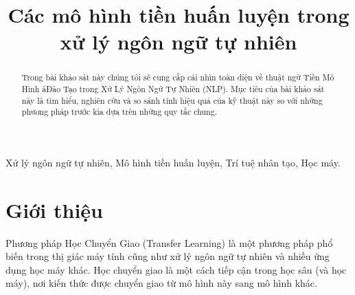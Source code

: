 \documentclass[conference]{IEEEtran}
\begin{document}
\title{Các mô hình tiền huấn luyện trong xử lý ngôn ngữ tự nhiên}

\author{
\and

\and

\and

}

\maketitle

\begin{abstract}
Trong bài khảo sát này chúng tôi sẽ cung cấp cái nhìn toàn diện về thuật ngữ Tiền Mô Hình âĐào Tạo trong Xử Lý Ngôn Ngữ Tự Nhiên (NLP). Mục tiêu của bài khảo sát này là tìm hiểu, nghiên cứu và so sánh tính hiệu quả của kỹ thuật này so với những phương pháp trước kia dựa trên những quy tắc chung.     
\end{abstract}

\begin{IEEEkeywords}
Xử lý ngôn ngữ tự nhiên, Mô hình tiền huấn luyện, Trí tuệ nhân tạo, Học máy.
\end{IEEEkeywords}

\section{Giới thiệu}
Phương pháp Học Chuyển Giao (Transfer Learning) là một phương pháp phổ biến trong thị giác máy tính cũng như xử lý ngôn ngữ tự nhiên và nhiều ứng dụng học máy khác. Học chuyển giao là một cách tiếp cận trong học sâu (và học máy), nơi kiến thức được chuyển giao từ mô hình này sang mô hình khác.
\end{document}
